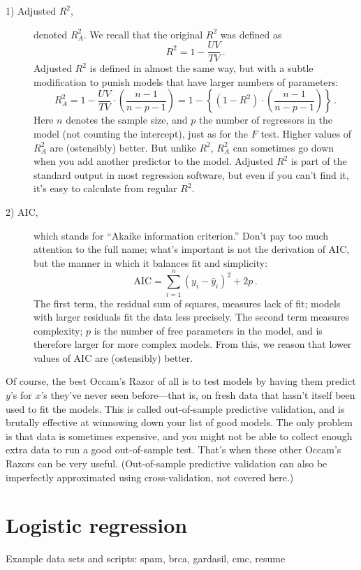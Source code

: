 \documentclass[11pt]{article}
\newcommand{\1}[1]{\mathbf{1}_{\{ {#1} \}}}
\begin{document}
\begin{description}

\item[1) Adjusted $R^2$,] denoted $R^2_A$.  We recall that the original $R^2$ was defined as
$$
R^2 =  1 - \frac{UV}{TV} \, .
$$
Adjusted $R^2$ is defined in almost the same way, but with a subtle modification to punish models that have larger numbers of parameters:
$$
R_A^2 =  1 - \frac{UV}{TV} \cdot \left( \frac{n-1}{n-p-1} \right)  = 1 - \left\{ (1-R^2) \cdot \left( \frac{n-1}{n-p-1} \right) \right\} \, .
$$
Here $n$ denotes the sample size, and $p$ the number of regressors in the model (not counting the intercept), just as for the $F$ test.  Higher values of $R_A^2$ are (ostensibly) better.  But unlike $R^2$, $R^2_A$ can sometimes go down when you add another predictor to the model.  Adjusted $R^2$ is part of the standard output in most regression software, but even if you can't find it, it's easy to calculate from regular $R^2$.

\item[2) AIC,] which stands for ``Akaike information criterion.''  Don't pay too much attention to the full name; what's important is not the derivation of AIC, but the manner in which it balances fit and simplicity:
$$
\mbox{AIC} =  \sum_{i=1}^n (y_i - \hat{y}_i)^2 + 2 p \, .
$$
The first term, the residual sum of squares, measures lack of fit; models with larger residuals fit the data less precisely.  The second term measures complexity; $p$ is the number of free parameters in the model, and is therefore larger for more complex models.  From this, we reason that lower values of AIC are (ostensibly) better.

\end{description}

Of course, the best Occam's Razor of all is to test models by having them predict $y$'s for $x$'s they've never seen before---that is, on fresh data that hasn't itself been used to fit the models.  This is called out-of-sample predictive validation, and is brutally effective at winnowing down your list of good models.  The only problem is that data is sometimes expensive, and you might not be able to collect enough extra data to run a good out-of-sample test.  That's when these other Occam's Razors can be very useful.  (Out-of-sample predictive validation can also be imperfectly approximated using cross-validation, not covered here.)


\section{Logistic regression}
Example data sets and scripts: spam, brca, gardasil, cmc, resume
\end{document}
